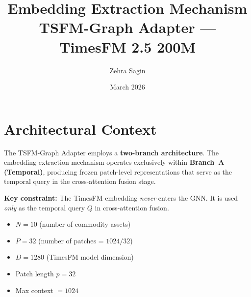 \documentclass[11pt,a4paper]{article}
\title{\textbf{Embedding Extraction Mechanism}\\[0.3em]
\large TSFM-Graph Adapter --- TimesFM 2.5 200M}
\author{Zehra Sagin}
\date{March 2026}
\begin{document}
\maketitle
\tableofcontents
\newpage

\section{Architectural Context}

The TSFM-Graph Adapter employs a \textbf{two-branch architecture}. The embedding extraction mechanism operates exclusively within \textbf{Branch~A (Temporal)}, producing frozen patch-level representations that serve as the temporal query in the cross-attention fusion stage.

\begin{table}[h]
\centering
\caption{Two-branch architecture overview.}
\smallskip
\small
{}
\end{table}

\noindent
\textbf{Key constraint:} The TimesFM embedding \emph{never} enters the GNN. It is used \emph{only} as the temporal query $Q$ in cross-attention fusion.

\begin{itemize}[nosep]
    \item $N = 10$ (number of commodity assets)
    \item $P = 32$ (number of patches = $1024 / 32$)
    \item $D = 1280$ (TimesFM model dimension)
    \item Patch length $p = 32$
    \item Max context $= 1024$
\end{itemize}
\end{document}

